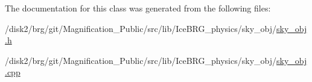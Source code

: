 The documentation for this class was generated from the following files\+:\begin{DoxyCompactItemize}
\item 
/disk2/brg/git/\+Magnification\+\_\+\+Public/src/lib/\+Ice\+B\+R\+G\+\_\+physics/sky\+\_\+obj/\hyperlink{sky__obj_8h}{sky\+\_\+obj.\+h}\item 
/disk2/brg/git/\+Magnification\+\_\+\+Public/src/lib/\+Ice\+B\+R\+G\+\_\+physics/sky\+\_\+obj/\hyperlink{sky__obj_8cpp}{sky\+\_\+obj.\+cpp}\end{DoxyCompactItemize}
